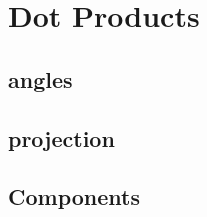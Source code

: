 \newpage
\section{Dot Products}
\noindent{}
\subsection{angles}
\subsection{projection}
\subsection{Components}

\newpage
